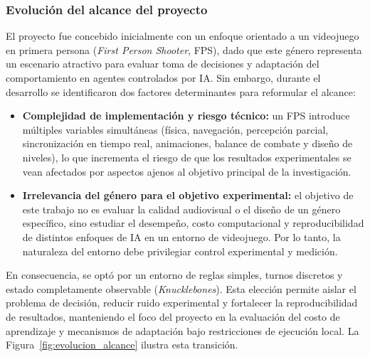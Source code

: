\subsubsection{Evolución del alcance del proyecto}

El proyecto fue concebido inicialmente con un enfoque orientado a un videojuego en primera persona (\textit{First Person Shooter}, FPS), dado que este género representa un escenario atractivo para evaluar toma de decisiones y adaptación del comportamiento en agentes controlados por IA. Sin embargo, durante el desarrollo se identificaron dos factores determinantes para reformular el alcance:

\begin{itemize}
    \item \textbf{Complejidad de implementación y riesgo técnico:} un FPS introduce múltiples variables simultáneas (física, navegación, percepción parcial, sincronización en tiempo real, animaciones, balance de combate y diseño de niveles), lo que incrementa el riesgo de que los resultados experimentales se vean afectados por aspectos ajenos al objetivo principal de la investigación.
    \item \textbf{Irrelevancia del género para el objetivo experimental:} el objetivo de este trabajo no es evaluar la calidad audiovisual o el diseño de un género específico, sino estudiar el desempeño, costo computacional y reproducibilidad de distintos enfoques de IA en un entorno de videojuego. Por lo tanto, la naturaleza del entorno debe privilegiar control experimental y medición.
\end{itemize}

En consecuencia, se optó por un entorno de reglas simples, turnos discretos y estado completamente observable (\textit{Knucklebones}). Esta elección permite aislar el problema de decisión, reducir ruido experimental y fortalecer la reproducibilidad de resultados, manteniendo el foco del proyecto en la evaluación del costo de aprendizaje y mecanismos de adaptación bajo restricciones de ejecución local. La Figura~\ref{fig:evolucion_alcance} ilustra esta transición.

